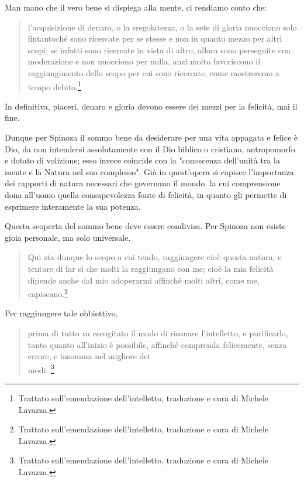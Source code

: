 Man mano che il vero bene si dispiega alla mente, ci rendiamo conto che:

\begin{quotation}
	\small l'acquisizione di denaro, o la sregolatezza, o la sete di gloria nuocciono solo
	fintantoché sono ricercate per se stesse e non in quanto mezzo per altri scopi; se infatti sono
	ricercate in vista di altro, allora sono perseguite con moderazione e non nuocciono per nulla, anzi
	molto favoriscono il raggiungimento dello scopo per cui sono ricercate, come mostreremo a tempo
	debito.\footnote{Trattato sull'emendazione dell'intelletto, traduzione e cura di Michele Lavazza.}
\end{quotation}

In definitiva, piaceri, denaro e gloria devono essere dei mezzi per la felicità, mai il fine.

Dunque per Spinoza il sommo bene da desiderare per una vita appagata e felice è Dio, da non intendersi assolutamente con il Dio biblico o cristiano, antropomorfo e dotato di volizione; esso invece coincide con la "conoscenza dell'unità tra la mente e la Natura nel suo complesso". Già in quest'opera si capisce l'importanza dei rapporti di natura necessari che governano il mondo, la cui comprensione dona all'uomo quella consapevolezza fonte di felicità, in quanto gli permette di esprimere interamente la sua potenza.

Questa scoperta del sommo bene deve essere condivisa. Per Spinoza non esiste gioia personale, ma solo universale.

\begin{quotation}
	\small Qui sta dunque lo scopo a cui tendo, raggiungere cioè
	questa natura, e tentare di far sì che molti la raggiungano con me; cioè la mia felicità dipende anche
	dal mio adoperarmi affinché molti altri, come me, capiscano.\footnote{Trattato sull'emendazione dell'intelletto, traduzione e cura di Michele Lavazza.}
\end{quotation}

Per raggiungere tale obbiettivo,

\begin{quotation}
	\small  prima di tutto va escogitato il modo di
	risanare l'intelletto, e purificarlo, tanto quanto all'inizio è possibile, affinché comprenda felicemente,
	senza errore, e insomma nel migliore dei \\modi. \footnote{Trattato sull'emendazione dell'intelletto, traduzione e cura di Michele Lavazza.}
\end{quotation}

